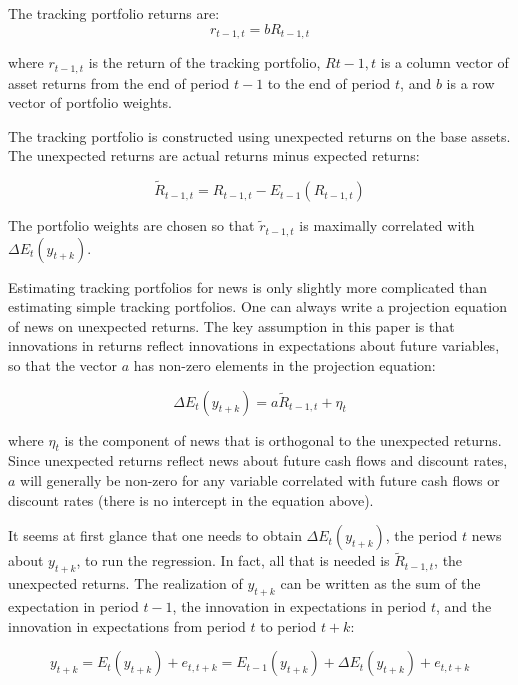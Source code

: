 The tracking portfolio returns are: 
\begin{equation}
    r_{t-1,t} = bR_{t-1,t}
\end{equation}

where $r_{t-1,t}$ is the return of the tracking portfolio,
$R{t-1,t}$ is a column vector of asset returns from the end 
of period $t-1$ to the end of period $t$, and $b$ is a row 
vector of portfolio weights.

The tracking portfolio is constructed using unexpected returns 
on the base assets. The unexpected returns are actual returns 
minus expected returns:

\begin{equation}
    \tilde{R}_{t-1,t} = R_{t-1,t} - E_{t-1}(R_{t-1,t})
\end{equation}

The portfolio weights are chosen so that $\tilde{r}_{t-1,t}$
is maximally correlated with $\Delta E_t(y_{t+k})$.

Estimating tracking portfolios for news is only slightly 
more complicated than estimating simple tracking portfolios. 
One can always write a projection equation of news on 
unexpected returns. The key assumption in this paper 
is that innovations in returns reflect innovations in 
expectations about future variables, so that the vector $a$
has non-zero elements in the projection equation:

\begin{equation}
    \Delta E_t(y_{t+k}) = a\tilde{R}_{t-1,t} + \eta_t
\end{equation}

where $\eta_t$ is the component of news that is orthogonal
to the unexpected returns. Since unexpected returns reflect
news about future cash flows and discount rates, $a$
will generally be non-zero for any variable correlated 
with future cash flows or discount rates (there is no 
intercept in the equation above).

It seems at first glance that one needs to obtain $\Delta E_t(y_{t+k})$,
the period $t$ news about $y_{t+k}$, to run the regression.
In fact, all that is needed is $\tilde{R}_{t-1,t}$, the
unexpected returns. The realization of $y_{t+k}$ 
can be written as the sum of the expectation in period $t-1$,
the innovation in expectations in period $t$, and the
innovation in expectations from period $t$ to period $t+k$:

\begin{equation}
    y_{t+k} = E_{t}(y_{t+k}) + e_{t,t+k} = E_{t-1}(y_{t+k}) + \Delta E_t(y_{t+k}) + e_{t,t+k}
\end{equation}

